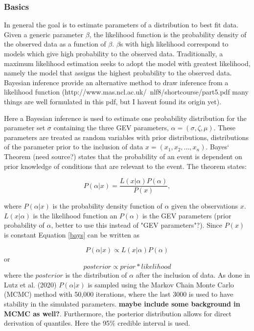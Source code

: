 \subsubsection{Basics}
In general the goal is to estimate parameters of a distribution to best fit data. Given a generic parameter $\beta$, the likelihood function is the probability density of the observed data as a function of $\beta$. $\beta$s with high likelihood correspond to models which give high probability to the observed data. Traditionally, a maximum likelihood estimation seeks to adopt the model with greatest likelihood, namely the model that assigns the highest probability to the observed data. Bayesian inference provide an alternative method to draw inference from a likelihood function (http://www.mas.ncl.ac.uk/~nlf8/shortcourse/part5.pdf many things are well formulated in this pdf, but I havent found its origin yet). 

Here a Bayesian inference is used to estimate one probability distribution for the parameter set $\sigma$ containing the three GEV parameters, $\alpha = (\sigma, \zeta, \mu)$. These parameters are treated as random variables with prior distributions, distributions of the parameter prior to the inclusion of data $x = (x_1, x_2,...,x_n)$. Bayes` Theorem (need source?) states that the probability of an event is dependent on prior knowledge of conditions that are relevant to the event. The theorem states:

\begin{equation}
P(\alpha \vert x) = \frac{L(x \vert \alpha)P(\alpha)}{P(x)},
\label{bays}
\end{equation}

where $P(\alpha \vert x)$ is the probability density function of $\alpha$ given the observations $x$. $L(x \vert \alpha)$ is the likelihood function an $P(\alpha)$ is the GEV parameters (prior probability of $\alpha$, better to use this instead of "GEV parameters"?). Since $P(x)$ is constant Equation \eqref{bays} can be written as 

\begin{equation}
P(\alpha \vert x)\propto L(x \vert \alpha)P(\alpha)
\end{equation}  
or
\begin{equation}
posterior \propto prior * likelihood
\end{equation}
where the $posterior$ is the distribution of $\alpha$ after the inclusion of data. As done in Lutz et al. (2020) $P(\alpha \vert x)$ is sampled using the Markov Chain Monte Carlo (MCMC) method with 50,000 iterations, where the last 3000 is used to have stability in the simulated parameters. \textbf{maybe include some background in MCMC as well?}. Furthermore, the posterior distribution allows for direct derivation of quantiles. Here the 95\% credible interval is used.  
